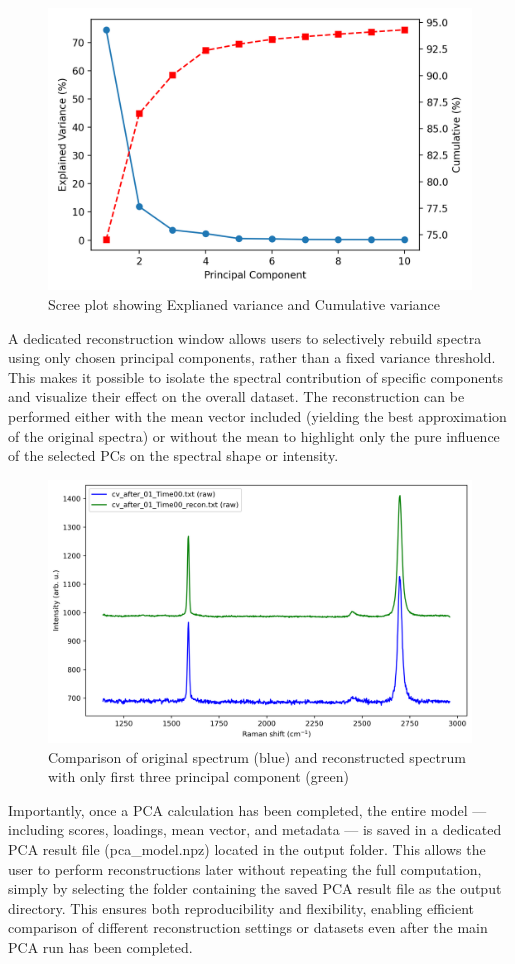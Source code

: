 \begin{figure}[H]
    \centering
    \includegraphics[width=0.5\linewidth]{Resources/scree_plot.png}
    \caption{Scree plot showing Explianed variance and Cumulative variance}
    \label{scree_plot}
\end{figure}

A dedicated reconstruction window allows users to selectively rebuild spectra using only chosen principal components, rather than a fixed variance threshold. This makes it possible to isolate the spectral contribution of specific components and visualize their effect on the overall dataset. The reconstruction can be performed either with the mean vector included (yielding the best approximation of the original spectra) or without the mean to highlight only the pure influence of the selected PCs on the spectral shape or intensity.

\begin{figure}
    \centering
    \includegraphics[width=0.75\linewidth]{Resources/00_compare.png}
    \caption{Comparison of original spectrum (blue) and reconstructed spectrum with only first three principal component (green)}
    \label{recon_compare}
\end{figure}

Importantly, once a PCA calculation has been completed, the entire model — including scores, loadings, mean vector, and metadata — is saved in a dedicated PCA result file (pca\_model.npz) located in the output folder. This allows the user to perform reconstructions later without repeating the full computation, simply by selecting the folder containing the saved PCA result file as the output directory. This ensures both reproducibility and flexibility, enabling efficient comparison of different reconstruction settings or datasets even after the main PCA run has been completed.

